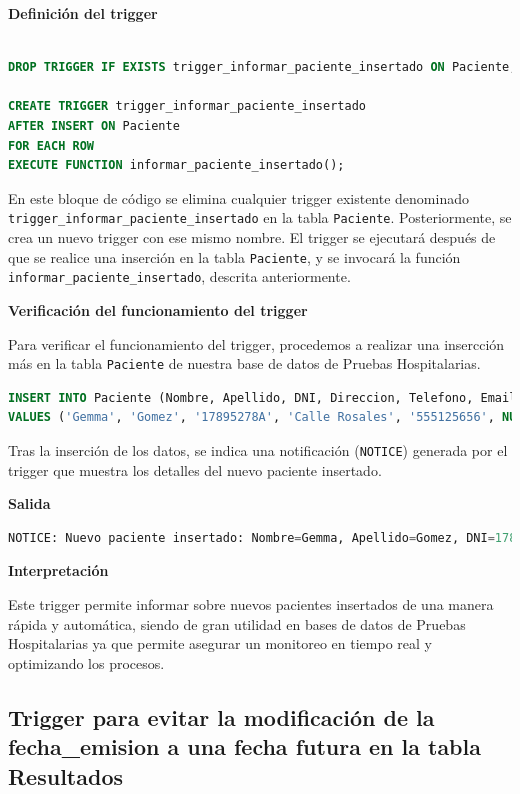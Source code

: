 \documentclass[spanish]{article}
\begin{document}
\newpage
\textbf{Definición del trigger}

\begin{lstlisting}[language=SQL] 

DROP TRIGGER IF EXISTS trigger_informar_paciente_insertado ON Paciente;

CREATE TRIGGER trigger_informar_paciente_insertado 
AFTER INSERT ON Paciente 
FOR EACH ROW 
EXECUTE FUNCTION informar_paciente_insertado(); 
\end{lstlisting}

En este bloque de código se elimina cualquier trigger existente denominado \texttt{trigger\_informar\_paciente\_insertado} en la tabla \texttt{Paciente}. Posteriormente, se crea un nuevo trigger con ese mismo nombre. El trigger se ejecutará después de que se realice una inserción en la tabla \texttt{Paciente}, y se invocará la función \texttt{informar\_paciente\_insertado}, descrita anteriormente.


\textbf{Verificación del funcionamiento del trigger}

Para verificar el funcionamiento del trigger, procedemos a realizar una insercción más en la tabla \texttt{Paciente} de nuestra base de datos de Pruebas Hospitalarias. 

\begin{lstlisting}[language=SQL] 
INSERT INTO Paciente (Nombre, Apellido, DNI, Direccion, Telefono, Email, Fecha_nacimiento, Sexo, no_seguridad_social) 
VALUES ('Gemma', 'Gomez', '17895278A', 'Calle Rosales', '555125656', NULL, '1985-01-21', 'F', '123444449'); 
\end{lstlisting}

Tras la inserción de los datos, se indica una notificación (\texttt{NOTICE}) generada por el trigger que muestra los detalles del nuevo paciente insertado.

\textbf{Salida}
\begin{lstlisting}[language=SQL] 
NOTICE: Nuevo paciente insertado: Nombre=Gemma, Apellido=Gomez, DNI=17895278A
\end{lstlisting}

\textbf{Interpretación}

Este trigger permite informar sobre nuevos pacientes insertados de una manera rápida y automática, siendo de gran utilidad en bases de datos de Pruebas Hospitalarias ya que permite asegurar un monitoreo en tiempo real y optimizando los procesos.


\subsection{Trigger para evitar la modificación de la fecha\_emision a una fecha futura en la tabla Resultados}
\end{document}
